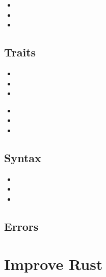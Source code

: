 \documentclass[xcolor={svgnames},hyperref]{beamer}
\begin{document}
    \begin{frame}
        \begin{itemize}
            \item
            \item
            \item
        \end{itemize}
    \end{frame}

\subsection{Traits}
    \begin{frame}
        \begin{itemize}
            \item
            \item
            \item
        \end{itemize}
    \end{frame}


    \begin{frame}
        \begin{itemize}
            \item
            \item
            \item
        \end{itemize}
    \end{frame}

\subsection{Syntax}

    \begin{frame}
        \begin{itemize}
            \item
            \item
            \item
        \end{itemize}
    \end{frame}

\subsection{Errors}

\section{Improve Rust}
\end{document}
